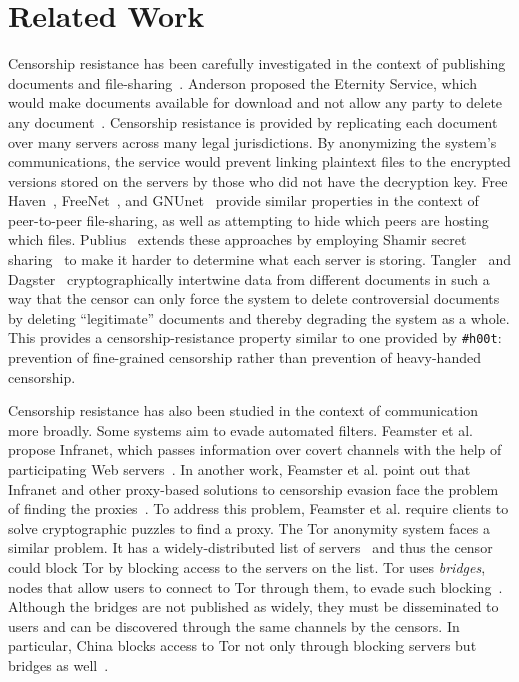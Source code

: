\documentclass{sig-alternate-arxiv}
\newcommand{\hoot}{{\tt \#h00t}\xspace}
\begin{document}
%
\section{Related Work}
\label{sec:related}

Censorship resistance has been carefully investigated in the context of
publishing documents and
file-sharing~\cite{eternity,freehaven,freenet,gnunet-esed,publius,tangler,dagster}.
Anderson proposed the Eternity Service, which would make documents
available for download and not allow any party to delete any
document~\cite{eternity}. Censorship resistance is provided by
replicating each document over many servers across many legal
jurisdictions. By anonymizing the system's communications, the service
would prevent linking plaintext files to the encrypted versions stored
on the servers by those who did not have the decryption key. Free
Haven~\cite{freehaven}, FreeNet~\cite{freenet}, and
GNUnet~\cite{gnunet-esed} provide similar properties in the context of
peer-to-peer file-sharing, as well as attempting to hide which peers are
hosting which files. Publius~\cite{publius} extends these approaches by
employing Shamir secret sharing~\cite{shamir} to make it harder to
determine what each server is storing. Tangler~\cite{tangler} and
Dagster~\cite{dagster} cryptographically intertwine data from different
documents in such a way that the censor can only force the system to
delete controversial documents by deleting ``legitimate'' documents and
thereby degrading the system as a whole. This provides a
censorship-resistance property similar to one provided by \hoot:
prevention of fine-grained censorship rather than prevention of
heavy-handed censorship.

Censorship resistance has also been studied in the context of
communication more broadly. Some systems aim to evade automated
filters. Feamster et al. propose Infranet, which passes information over
covert channels with the help of participating Web
servers~\cite{infranet}. In another work, Feamster et al. point out that
Infranet and other proxy-based solutions to censorship evasion face the
problem of finding the proxies~\cite{feamster03proxy}. To address this
problem, Feamster et al. require clients to solve cryptographic puzzles
to find a proxy. The Tor anonymity system faces a similar problem. It
has a widely-distributed list of servers~\cite{tor} and thus the censor
could block Tor by blocking access to the servers on the list. Tor uses
{\em bridges}, nodes that allow users to connect to Tor through them, to
evade such blocking~\cite{tor-bridges}. Although the bridges are not
published as widely, they must be disseminated to users and can be
discovered through the same channels by the censors. In particular,
China blocks access to Tor not only through blocking servers but bridges
as well~\cite{tor-china}.
\end{document}
